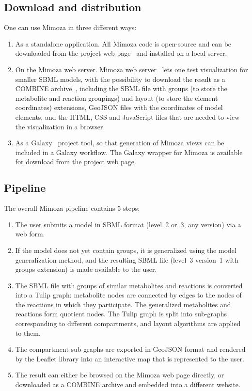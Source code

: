 \documentclass{bmcart}
\begin{document}
\subsection*{Download and distribution}
   
One can use Mimoza in three different ways:
\begin{enumerate}
\item As a standalone application.
All Mimoza code is open-source and can be downloaded from the project web page~\cite{Zhukovaa} and installed on a local server.
\item On the Mimoza web server.
Mimoza web server~\cite{Zhukovaa} lets one test visualization for smaller SBML models, with the possibility to download the result as a COMBINE archive~\cite{Bergmann2014}, including the SBML file with groups (to store the metabolite and reaction groupings) and layout (to store the element coordinates) extensions, GeoJSON files with the coordinates of model elements, and the HTML, CSS and JavaScript files that are needed to view the visualization in a browser.
\item As a Galaxy~\cite{Blankenberg2010} project tool, so that generation of Mimoza views can be included in a Galaxy workflow.
The Galaxy wrapper for Mimoza is available for download from the project web page.
\end{enumerate}

 
\subsection*{Pipeline}
The overall Mimoza pipeline contains 5 steps:
\begin{enumerate}
\item The user submits a model in SBML format (level~2 or~3, any version) via a web form.
\item If the model does not yet contain groups, it is generalized using the model generalization method, and the resulting SBML file (level~3 version~1 with groups extension) is made available to the user.
\item The SBML file with groups of similar metabolites and reactions is converted into a Tulip graph: metabolite nodes are connected by edges to the nodes of the reactions in which they participate. The generalized metabolites and reactions form quotient nodes. The Tulip graph is split into sub-graphs corresponding to different compartments, and layout algorithms are applied to them.
\item The compartment sub-graphs are exported in GeoJSON format and rendered by the Leaflet library into an interactive map that is represented to the user.
\item The result can either be browsed on the Mimoza web page directly, or downloaded as a COMBINE archive and embedded into a different website.
\end{enumerate}
\end{document}
